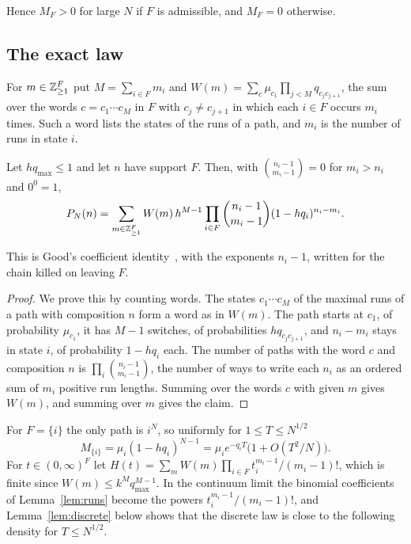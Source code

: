 Hence $M_F>0$ for large $N$ if $F$ is admissible, and $M_F=0$ otherwise.

\subsection{The exact law}

For $m\in\mathbb{Z}_{\ge1}^F$ put $M=\sum_{i\in F}m_i$ and
$W(m)=\sum_c\mu_{c_1}\prod_{j<M}q_{c_jc_{j+1}}$, the sum over the words
$c=c_1\cdots c_M$ in $F$ with $c_j\ne c_{j+1}$ in which each $i\in F$ occurs
$m_i$ times. Such a word lists the states of the runs of a path, and $m_i$ is
the number of runs in state $i$.

\begin{lemma}\label{lem:runs}
Let $hq_{\max}\le1$ and let $n$ have support $F$. Then, with
$\binom{n_i-1}{m_i-1}=0$ for $m_i>n_i$ and $0^0=1$,
\[
P_N(n)=\sum_{m\in\mathbb{Z}_{\ge1}^F}W(m)\,h^{M-1}\prod_{i\in F}\binom{n_i-1}{m_i-1}
(1-hq_i)^{n_i-m_i}.
\]
\end{lemma}

This is Good's coefficient identity~\cite[(3)]{good1961}, with the exponents
$n_i-1$, written for the chain killed on leaving $F$.

\begin{proof}
We prove this by counting words. The states $c_1\cdots c_M$ of the maximal runs of a path with composition $n$
form a word as in $W(m)$. The path starts at $c_1$, of probability
$\mu_{c_1}$, it has $M-1$ switches, of probabilities $hq_{c_jc_{j+1}}$, and
$n_i-m_i$ stays in state $i$, of probability $1-hq_i$ each. The number of paths
with the word $c$ and composition $n$ is $\prod_i\binom{n_i-1}{m_i-1}$, the number
of ways to write each $n_i$ as an ordered sum of $m_i$ positive run lengths.
Summing over the words $c$ with given $m$ gives $W(m)$, and summing over $m$ gives
the claim.
\end{proof}

For $F=\{i\}$ the only path is $i^N$, so uniformly for $1\le T\le N^{1/2}$
\begin{equation}\label{eq:vertexmax}
M_{\{i\}}=\mu_i(1-hq_i)^{N-1}=\mu_ie^{-q_iT}\bigl(1+O(T^2/N)\bigr).
\end{equation}
For $t\in(0,\infty)^F$ let $H(t)=\sum_mW(m)\prod_{i\in F}t_i^{m_i-1}/(m_i-1)!$,
which is finite since $W(m)\le k^Mq_{\max}^{M-1}$. In the continuum limit the
binomial coefficients of Lemma~\ref{lem:runs} become the powers
$t_i^{m_i-1}/(m_i-1)!$, and Lemma~\ref{lem:discrete} below shows that the discrete
law is close to the following density for $T\le N^{1/2}$.

